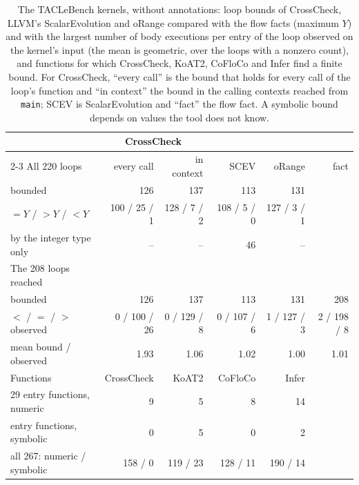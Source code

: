 \documentclass[oneside,english]{amsart}
\numberwithin{equation}{section}
\numberwithin{figure}{section}
\theoremstyle{plain}
\theoremstyle{definition}
\theoremstyle{plain}
\theoremstyle{remark}
\theoremstyle{plain}
\theoremstyle{definition}
\theoremstyle{plain}
\theoremstyle{remark}
\begin{document}
\begin{table}[ht]
\centering
\footnotesize
\setlength{\tabcolsep}{3.5pt}
\begin{tabular}{@{}lrrrrr@{}}
\toprule
 & \multicolumn{2}{c}{CrossCheck} & & & \\
\cmidrule(lr){2-3}
All 220 loops & every call & in context & SCEV & oRange & fact \\
\midrule
bounded & 126 & 137 & 113 & 131 & \\
\quad $= Y$ / $> Y$ / $< Y$ & 100 / 25 / 1 & 128 / 7 / 2 & 108 / 5 / 0 & 127 / 3 / 1 & \\
by the integer type only & -- & -- & 46 & -- & \\
\midrule
The 208 loops reached & & & & & \\
\midrule
bounded & 126 & 137 & 113 & 131 & 208 \\
\quad $<$ / $=$ / $>$ observed & 0 / 100 / 26 & 0 / 129 / 8 & 0 / 107 / 6 & 1 / 127 / 3 & 2 / 198 / 8 \\
\quad mean bound / observed & 1.93 & 1.06 & 1.02 & 1.00 & 1.01 \\
\midrule
Functions & CrossCheck & KoAT2 & CoFloCo & Infer & \\
\midrule
29 entry functions, numeric & 9 & 5 & 8 & 14 & \\
entry functions, symbolic & 0 & 5 & 0 & 2 & \\
all 267: numeric / symbolic & 158 / 0 & 119 / 23 & 128 / 11 & 190 / 14 & \\
\bottomrule
\end{tabular}
\caption{The TACLeBench kernels, without annotations: loop bounds of CrossCheck, LLVM's ScalarEvolution and oRange compared with the flow facts (maximum $Y$) and with the largest number of body executions per entry of the loop observed on the kernel's input (the mean is geometric, over the loops with a nonzero count), and functions for which CrossCheck, KoAT2, CoFloCo and Infer find a finite bound. For CrossCheck, ``every call'' is the bound that holds for every call of the loop's function and ``in context'' the bound in the calling contexts reached from \texttt{main}; SCEV is ScalarEvolution and ``fact'' the flow fact. A symbolic bound depends on values the tool does not know.}
\label{tab:tools}
\end{table}
\end{document}
